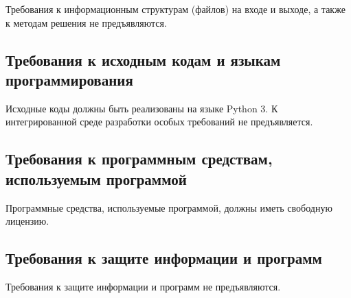 Требования к информационным структурам (файлов) на входе и выходе, а также к методам решения не предъявляются.

\subsection{Требования к исходным кодам и языкам программирования}
Исходные коды должны быть реализованы на языке Python 3. К интегрированной среде разработки особых требований 
не предъявляется.

\subsection{Требования к программным средствам, используемым программой}
Программные средства, используемые программой, должны иметь свободную лицензию.

\subsection{Требования к защите информации и программ}
Требования к защите информации и программ не предъявляются.



